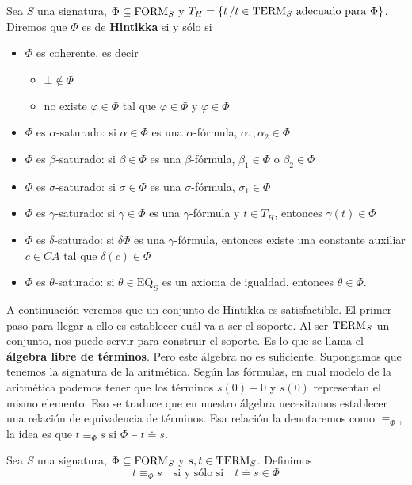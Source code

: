 \begin{definition}
  Sea $S$ una signatura,  $\Phi\subseteq \mbox{FORM}_{S}$ y $T_{H}=\{t \, / t \in \mbox{TERM}_{S}
  \mbox{ adecuado para } \Phi \}$. Diremos que $\Phi$ es de \textbf{Hintikka} si y sólo si
  \begin{itemize}
  \item $\Phi$ es coherente, es decir
    \begin{itemize}
    \item $\bot\not\in\Phi$
    \item no existe $\varphi\in\Phi$ tal que $\varphi\in\Phi$ y $\varphi\in\Phi$
    \end{itemize}
  \item $\Phi$ es $\alpha$-saturado: si $\alpha\in\Phi$ es una $\alpha$-fórmula, $\alpha_{1},\alpha_{2}\in\Phi$
  \item $\Phi$ es $\beta$-saturado: si $\beta\in\Phi$ es una $\beta$-fórmula, $\beta_{1}\in \Phi$ o $\beta_{2}\in\Phi$
  \item $\Phi$ es $\sigma$-saturado: si $\sigma\in\Phi$ es una $\sigma$-fórmula, $\sigma_{1}\in \Phi$
  \item $\Phi$ es $\gamma$-saturado: si $\gamma\in\Phi$ es una $\gamma$-fórmula y $t\in T_{H}$, entonces $\gamma(t)\in \Phi$
  \item $\Phi$ es $\delta$-saturado: si $\delta\Phi$ es una $\gamma$-fórmula, entonces existe una constante auxiliar $c\in CA$ tal que $\delta(c)\in \Phi$
  \item $\Phi$ es $\theta$-saturado: si $\theta\in\mathrm{EQ}_{S}$ es un axioma de igualdad, entonces $\theta\in\Phi$.
  \end{itemize}
\end{definition}

A continuación veremos que un conjunto de Hintikka es satisfactible. El primer paso para llegar a ello es establecer cuál va a ser el soporte. Al ser $\mbox{TERM}_{S}$ un conjunto, nos puede servir para construir el
soporte. Es lo que se llama el \textbf{álgebra libre de términos}. Pero este álgebra no es suficiente. Supongamos que tenemos la signatura de la aritmética. Según las fórmulas, en cual modelo de la aritmética podemos tener que los términos $s(0)+0$ y $s(0)$ representan el mismo elemento. Eso se traduce que en nuestro álgebra necesitamos establecer una relación de equivalencia de términos. Esa relación la denotaremos como
$\equiv_{\Phi}$, la idea es que $t \equiv_{\Phi} s$ si $\Phi\models
t \doteq s$.
\begin{definition}
  Sea $S$ una signatura, $\Phi\subseteq\mbox{FORM}_{S}$ y $s,t\in\mbox{TERM}_{S}$. Definimos
  \[ t\equiv_{\Phi}s\quad\mbox{si y sólo si}\quad t\doteq s\in\Phi \]
\end{definition}

